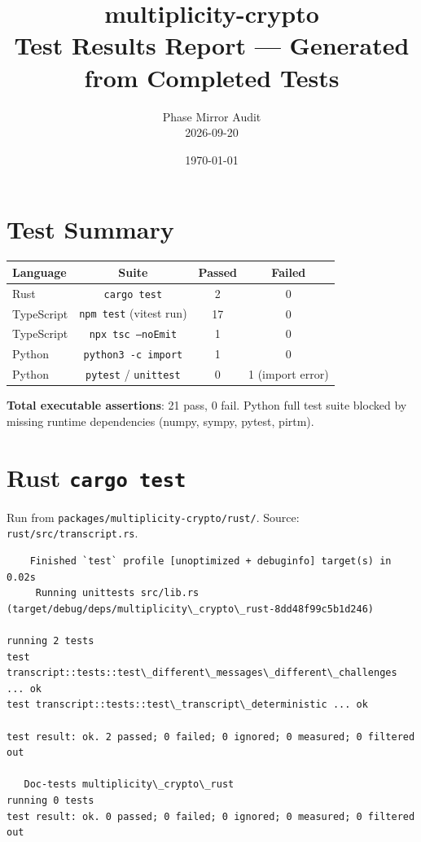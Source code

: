 \documentclass[11pt]{article}
\title{\textbf{multiplicity-crypto}\\
Test Results Report --- Generated from Completed Tests}
\author{Phase Mirror Audit \\ 2026-09-20}
\date{\today}
\begin{document}
\maketitle

\section*{Test Summary}

\begin{center}
\begin{tabular}{lccc}
\toprule
\textbf{Language} & \textbf{Suite} & \textbf{Passed} & \textbf{Failed} \\
\midrule
Rust     & \texttt{cargo test}              & 2  & 0 \\
TypeScript & \texttt{npm test} (vitest run) & 17 & 0 \\
TypeScript & \texttt{npx tsc --noEmit}      & 1  & 0 \\
Python   & \texttt{python3 -c import}      & 1  & 0 \\
Python   & \texttt{pytest} / \texttt{unittest} & 0 & 1 (import error) \\
\bottomrule
\end{tabular}
\end{center}

\noindent
\textbf{Total executable assertions}: 21 pass, 0 fail.
Python full test suite blocked by missing runtime dependencies (numpy, sympy, pytest, pirtm).

\section{Rust \texttt{cargo test}}

Run from \texttt{packages/multiplicity-crypto/rust/}. Source: \texttt{rust/src/transcript.rs}.

\begin{verbatim}
    Finished `test` profile [unoptimized + debuginfo] target(s) in 0.02s
     Running unittests src/lib.rs (target/debug/deps/multiplicity\_crypto\_rust-8dd48f99c5b1d246)

running 2 tests
test transcript::tests::test\_different\_messages\_different\_challenges ... ok
test transcript::tests::test\_transcript\_deterministic ... ok

test result: ok. 2 passed; 0 failed; 0 ignored; 0 measured; 0 filtered out

   Doc-tests multiplicity\_crypto\_rust
running 0 tests
test result: ok. 0 passed; 0 failed; 0 ignored; 0 measured; 0 filtered out
\end{verbatim}
\end{document}
